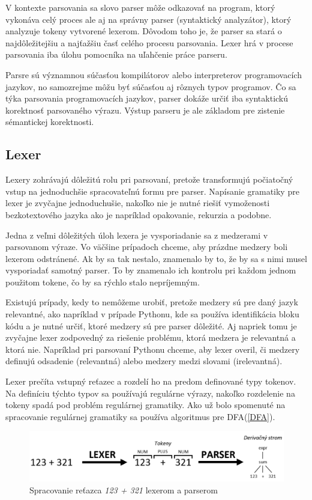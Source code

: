V kontexte parsovania sa slovo parser môže odkazovať na program, ktorý vykonáva celý proces ale aj na správny parser (syntaktický analyzátor), ktorý analyzuje tokeny vytvorené lexerom. Dôvodom toho je, že parser sa stará o najdôležitejšiu a najťažšiu časť celého procesu parsovania. Lexer hrá v procese parsovania iba úlohu pomocníka na uľahčenie práce parseru.

Parsre sú významnou súčasťou kompilátorov alebo interpreterov programovacích jazykov, no samozrejme môžu byť súčasťou aj rôznych typov programov. Čo sa týka parsovania programovacích jazykov, parser dokáže určiť iba syntaktickú korektnosť parsovaného výrazu. Výstup parseru je ale základom pre zistenie sémantickej korektnosti.

\subsection{Lexer}\label{lexer}
Lexery zohrávajú dôležitú  rolu pri parsovaní, pretože transformujú počiatočný vstup na jednoduchšie spracovateľnú formu pre parser. Napísanie gramatiky pre lexer je zvyčajne jednoduchušie, nakoľko nie je nutné riešiť vymoženosti bezkotextového jazyka ako je napríklad opakovanie, rekurzia a podobne.

Jedna z veľmi dôležitých úloh lexera je vysporiadanie sa z medzerami v parsovanom výraze. Vo väčšine prípadoch chceme, aby prázdne medzery boli lexerom odstránené. Ak by sa tak nestalo, znamenalo by to, že by sa s nimi musel vysporiadať samotný parser. To by znamenalo ich kontrolu pri každom jednom použitom tokene, čo by sa rýchlo stalo nepríjemným.

Existujú prípady, kedy to nemôžeme urobiť, pretože medzery sú pre daný jazyk relevantné, ako napríklad v prípade Pythonu, kde sa používa identifikácia bloku kódu a je nutné určiť, ktoré medzery sú pre parser dôležité. Aj napriek tomu je zvyčajne lexer zodpovedný za riešenie problému, ktorá medzera je relevantná a ktorá nie. Napríklad pri parsovaní Pythonu chceme, aby lexer overil, či medzery definujú odsadenie (relevantná) alebo medzery medzi slovami (irelevantná). \cite{tomassetti:parsing}

Lexer prečíta vstupný reťazec a rozdelí ho na predom definované typy tokenov. Na definíciu týchto typov sa používajú regulárne výrazy, nakoľko rozdelenie na tokeny spadá pod problém regulárnej gramatiky. Ako už bolo spomenuté na spracovanie regulárnej gramatiky sa používa algoritmus pre DFA(\ref{DFA}).

\begin{figure}[H]
\begin{center}
\includegraphics[width=14cm]{figures/lexer_parser.PNG}
\caption{Spracovanie reťazca \textit{123 + 321} lexerom a parserom}
\label{fig:lexer_parser}
\end{center}
\end{figure}


